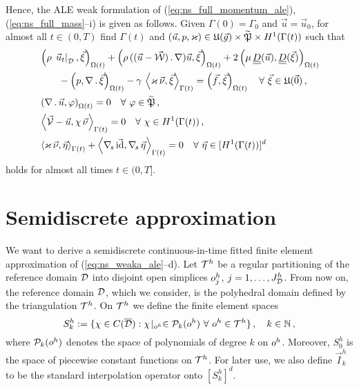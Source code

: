 Hence, the ALE weak formulation of (\ref{eq:ns_full_momentum_ale}),
(\ref{eq:ns_full_mass}--i) is given as follows. Given $\Gamma(0) = \Gamma_0$ and
$\vec u = \vec u_0$, for almost all $t\in(0,T)$ find $\Gamma(t)$ and ${(\vec u,
p, \varkappa)\in \mathfrak{U}(\vec{g}) \times \widetilde{\mathfrak{P}} \times H^1(\Gamma(t))}$
such that
\begin{subequations}
\begin{align}
& \left(\rho\,\left.\vec u_t\right|_{\D}, \vec \xi\right)_{\Omega(t)} +
\left(\rho\,((\vec u - \W)\,.\, \nabla )\vec u,\vec \xi\right)_{\Omega(t)}
+ 2\left(\mu\,\mat D(\vec u), \mat D(\vec \xi)\right)_{\Omega(t)} \nonumber \\
& \qquad - \left(p, \nabla\,.\,\vec \xi\right)_{\Omega(t)}
- \gamma\,\left\langle \varkappa\,\vec\nu, \vec\xi\right\rangle_{\Gamma(t)}
= \left(\vec f, \vec \xi\right)_{\Omega(t)}\quad \forall\ \vec\xi \in
\uspaceale 0 \,, \label{eq:ns_weaka_ale}\\
& \left(\nabla\,.\,\vec u, \varphi\right)_{\Omega(t)} = 0
\quad \forall\ \varphi \in \pnormspaceale\,, \label{eq:ns_weakb_ale} \\
&  \left\langle \V
- \vec u, \chi\,\vec\nu \right\rangle_{\Gamma(t)} = 0
\quad \forall\ \chi \in H^1(\Gamma(t))\,, \label{eq:ns_weakc_ale} \\
& \left\langle \varkappa\,\vec\nu, \vec\eta \right\rangle_{\Gamma(t)}
+ \left\langle \nabs\,\vec \id, \nabs\,\vec \eta \right\rangle_{\Gamma(t)}
= 0  \quad \forall\ \vec\eta \in [H^1(\Gamma(t))]^d\,\label{eq:ns_weakd_ale}
\end{align}
\end{subequations}
holds for almost all times $t \in (0,T]$.

\section{Semidiscrete approximation}\label{sec:ale_semi_fem}
We want to derive a semidiscrete continuous-in-time fitted finite element
approximation of (\ref{eq:ns_weaka_ale}--d). Let ${\cal T}^h$ be a regular
partitioning of the reference domain $\mathcal D$ into disjoint open simplices
$o^h_j$, $j = 1 ,\ldots, J^h_\mathcal D$. From now on, the reference domain $\mathcal D$,
which we consider, is the polyhedral domain defined by the triangulation
${\cal T}^h$. On ${\cal T}^h$ we define the finite element spaces
\begin{equation*}
S^h_k := \{\chi \in C(\overline{\mathcal D}) : \chi\!\mid_{o^h}
\in \mathcal{P}_k(o^h) \ \forall\ o^h \in {\cal T}^h\}\,,
\quad k \in \mathbb{N}\,,
\end{equation*}
where $\mathcal{P}_k(o^h)$ denotes the space of polynomials of degree $k$
on $o^h$. Moreover, $S^h_0$ is the space of piecewise constant
functions on ${\cal T}^h$. For later use, we also define $\vec I^h_k$ to be
the standard interpolation operator onto $[S^h_k]^d$.


